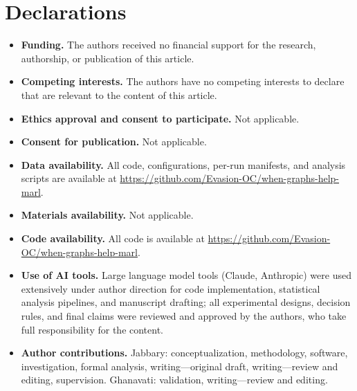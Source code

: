 \section*{Declarations}

\begin{itemize}
\item \textbf{Funding.} The authors received no financial support for the research, authorship, or publication of this article.
\item \textbf{Competing interests.} The authors have no competing interests to declare that are relevant to the content of this article.
\item \textbf{Ethics approval and consent to participate.} Not applicable.
\item \textbf{Consent for publication.} Not applicable.
\item \textbf{Data availability.} All code, configurations, per-run manifests, and analysis scripts are available at \url{https://github.com/Evasion-OC/when-graphs-help-marl}.
\item \textbf{Materials availability.} Not applicable.
\item \textbf{Code availability.} All code is available at \url{https://github.com/Evasion-OC/when-graphs-help-marl}.
\item \textbf{Use of AI tools.} Large language model tools (Claude, Anthropic) were used extensively under author direction for code implementation, statistical analysis pipelines, and manuscript drafting; all experimental designs, decision rules, and final claims were reviewed and approved by the authors, who take full responsibility for the content.
\item \textbf{Author contributions.} Jabbary: conceptualization, methodology, software, investigation, formal analysis, writing---original draft, writing---review and editing, supervision. Ghanavati: validation, writing---review and editing.
\end{itemize}



